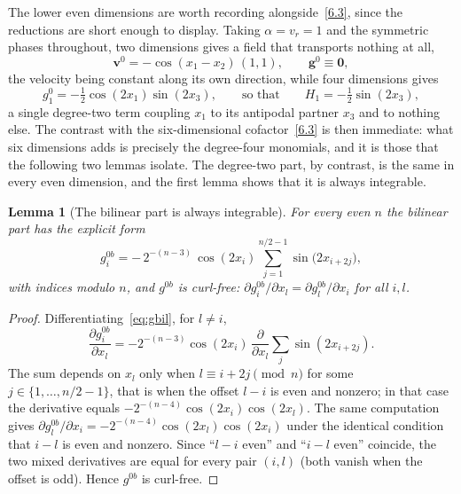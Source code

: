 \documentclass[11pt]{jfm}
\newtheorem{lemma}{Lemma}[section]
\numberwithin{equation}{section}
\begin{document}
The lower even dimensions are worth recording alongside~\eqref{6.3}, since the reductions are short
enough to display. Taking $\alpha=v_r=1$ and the symmetric phases throughout, two dimensions gives
a field that transports nothing at all,
\begin{equation}
\label{6.6a}
\boldsymbol{v}^0=-\cos(x_1-x_2)\,(1,1),
\qquad
\boldsymbol{g}^0\equiv\boldsymbol{0},
\end{equation}
the velocity being constant along its own direction, while four dimensions gives
\begin{equation}
\label{6.6b}
g_1^0=-\tfrac12\cos(2x_1)\sin(2x_3),
\qquad\text{so that}\qquad
H_1=-\tfrac12\sin(2x_3),
\end{equation}
a single degree-two term coupling $x_1$ to its antipodal partner $x_3$ and to nothing else. The
contrast with the six-dimensional cofactor~\eqref{6.3} is then immediate: what six dimensions adds
is precisely the degree-four monomials, and it is those that the following two lemmas isolate. The
degree-two part, by contrast, is the same in every even dimension, and the first lemma shows that
it is always integrable.

\begin{lemma}[The bilinear part is always integrable]
\label{lem:even-bilinear}
For every even $n$ the bilinear part has the explicit form
\begin{equation}
\label{eq:gbil}
g_i^{0b} = -\,2^{-(n-3)}\,\cos(2 x_i)\sum_{j=1}^{n/2-1}\sin\!\big(2 x_{i+2j}\big),
\end{equation}
with indices modulo $n$, and $g^{0b}$ is curl-free:
$\partial g_i^{0b}/\partial x_l = \partial g_l^{0b}/\partial x_i$ for all
$i,l$.
\end{lemma}

\begin{proof}
Differentiating~\eqref{eq:gbil}, for $l\neq i$,
\[
\frac{\partial g_i^{0b}}{\partial x_l}
= -2^{-(n-3)}\cos(2x_i)\,\frac{\partial}{\partial x_l}\sum_{j}\sin(2x_{i+2j}).
\]
The sum depends on $x_l$ only when $l\equiv i+2j\pmod n$ for some
$j\in\{1,\dots,n/2-1\}$, that is when the offset $l-i$ is even and nonzero; in that case the
derivative equals $-2^{-(n-4)}\cos(2x_i)\cos(2x_l)$. The same computation gives
$\partial g_l^{0b}/\partial x_i = -2^{-(n-4)}\cos(2x_l)\cos(2x_i)$ under the
identical condition that $i-l$ is even and nonzero. Since ``$l-i$ even'' and ``$i-l$ even''
coincide, the two mixed derivatives are equal for every pair $(i,l)$ (both vanish when the
offset is odd). Hence $g^{0b}$ is curl-free.
\end{proof}
\end{document}
